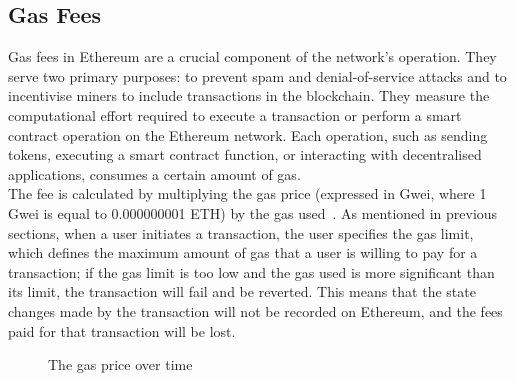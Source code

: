 \subsection{Gas Fees}
Gas fees in Ethereum are a crucial component of the network's operation. They serve two primary purposes: to prevent spam and denial-of-service attacks and to incentivise miners to include transactions in the blockchain. They measure the computational effort required to execute a transaction or perform a smart contract operation on the Ethereum network. Each operation, such as sending tokens, executing a smart contract function, or interacting with decentralised applications, consumes a certain amount of gas.
\\[3mm]
The fee is calculated by multiplying the gas price (expressed in Gwei, where 1 Gwei is equal to 0.000000001 ETH) by the gas used~\cite{noauthor_gas_nodate}. As mentioned in previous sections, when a user initiates a transaction, the user specifies the gas limit, which defines the maximum amount of gas that a user is willing to pay for a transaction; if the gas limit is too low and the gas used is more significant than its limit, the transaction will fail and be reverted. This means that the state changes made by the transaction will not be recorded on Ethereum, and the fees paid for that transaction will be lost.

\begin{figure}[!htb]
    \centering
    \caption{The gas price over time}
    \label{fig:gwei_over_time}
\end{figure}

